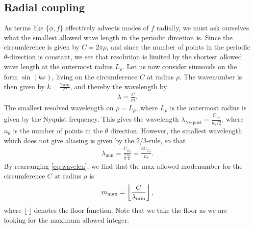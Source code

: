 \subsection{Radial coupling}
%
As terms like $\{\phi, f\}$ effectively advects modes of $f$ radially, we must ask ourselves what the smallest allowed wave length in the periodic dircetion is.
Since the circumference is given by $C=2\pi\rho$, and since the number of points in the periodic $\theta$-direction is constant, we see that resolution is limited by the shortest allowed wave length at the outermost radius $L_\rho$.
Let us now consider sinusoids on the form $\sin(kx)$, living on the circumference $C$ at radius $\rho$.
The wavenumber is then given by $k=\frac{2\pi m}{C}$, and thereby the wavelength by
%
\begin{align}
    \lambda = \frac{C}{m}.
    \label{eq:wavelen}
\end{align}
%
The smallest resolved wavelength on $\rho=L_\rho$, where $L_\rho$ is the outermost radius is given by the Nyquist frequency.
This gives the wavelength $\lambda_{\text{Nyquist}} = \frac{C_{L_\rho}}{n_\theta/2}$, where $n_\theta$ is the number of points in the $\theta$ direction.
However, the smallest wavelength which does not give aliasing is given by the $2/3$-rule, so that
%
\begin{align*}
    \lambda_\min = \frac{C_{L_\rho}}{\frac{2}{3}\frac{n_\theta}{2}} = \frac{3C_{L_\rho}}{n_\theta}.
\end{align*}
%
By rearranging \cref{eq:wavelen}, we find that the max allowed modenumber for the circumference $C$ at radius $\rho$ is
%
\begin{align*}
    m_{\text{max}} = \left\lfloor \frac{C}{\lambda_{\text{min}}}\right\rfloor,
\end{align*}
%
where $\lfloor \cdot \rfloor$ denotes the floor function.
Note that we take the floor as we are looking for the maximum allowed integer.

